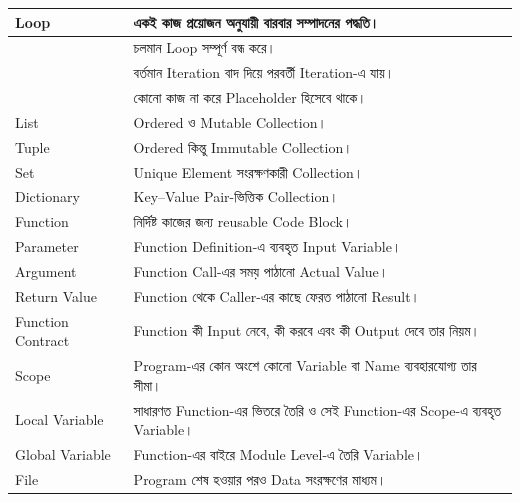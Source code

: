 \begin{longtable}{
|L{0.28\textwidth}
|L{0.64\textwidth}|
}
Loop
&
একই কাজ প্রয়োজন অনুযায়ী বারবার সম্পাদনের পদ্ধতি।
\\
\hline

&
চলমান Loop সম্পূর্ণ বন্ধ করে।
\\
\hline

&
বর্তমান Iteration বাদ দিয়ে পরবর্তী Iteration-এ যায়।
\\
\hline

&
কোনো কাজ না করে Placeholder হিসেবে থাকে।
\\
\hline

List
&
Ordered ও Mutable Collection।
\\
\hline

Tuple
&
Ordered কিন্তু Immutable Collection।
\\
\hline

Set
&
Unique Element সংরক্ষণকারী Collection।
\\
\hline

Dictionary
&
Key--Value Pair-ভিত্তিক Collection।
\\
\hline

Function
&
নির্দিষ্ট কাজের জন্য reusable Code Block।
\\
\hline

Parameter
&
Function Definition-এ ব্যবহৃত Input Variable।
\\
\hline

Argument
&
Function Call-এর সময় পাঠানো Actual Value।
\\
\hline

Return Value
&
Function থেকে Caller-এর কাছে ফেরত পাঠানো Result।
\\
\hline

Function Contract
&
Function কী Input নেবে, কী করবে এবং কী Output দেবে তার নিয়ম।
\\
\hline

Scope
&
Program-এর কোন অংশে কোনো Variable বা Name ব্যবহারযোগ্য তার সীমা।
\\
\hline

Local Variable
&
সাধারণত Function-এর ভিতরে তৈরি ও সেই Function-এর Scope-এ ব্যবহৃত Variable।
\\
\hline

Global Variable
&
Function-এর বাইরে Module Level-এ তৈরি Variable।
\\
\hline

File
&
Program শেষ হওয়ার পরও Data সংরক্ষণের মাধ্যম।
\\
\hline

\end{longtable}

